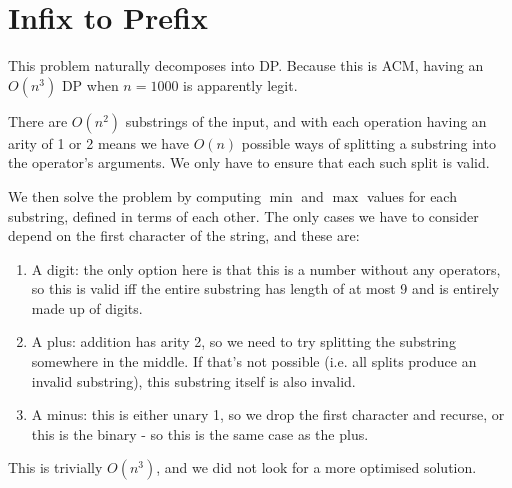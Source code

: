 \section{Infix to Prefix}

This problem naturally decomposes into DP. Because this is ACM, having an
$O(n^3)$ DP when $n = 1000$ is apparently legit.

There are $O(n^2)$ substrings of the input, and with each operation having an
arity of 1 or 2 means we have $O(n)$ possible ways of splitting a substring into
the operator's arguments. We only have to ensure that each such split is valid.

We then solve the problem by computing $\min$ and $\max$ values for each
substring, defined in terms of each other. The only cases we have to consider
depend on the first character of the string, and these are:

\begin{enumerate}

  \item A digit: the only option here is that this is a number without any
  operators, so this is valid iff the entire substring has length of at most 9
  and is entirely made up of digits.

  \item A plus: addition has arity 2, so we need to try splitting the substring
  somewhere in the middle. If that's not possible (i.e. all splits produce an
  invalid substring), this substring itself is also invalid.

  \item A minus: this is either unary 1, so we drop the first character and
  recurse, or this is the binary - so this is the same case as the plus.

\end{enumerate}

This is trivially $O(n^3)$, and we did not look for a more optimised solution.

